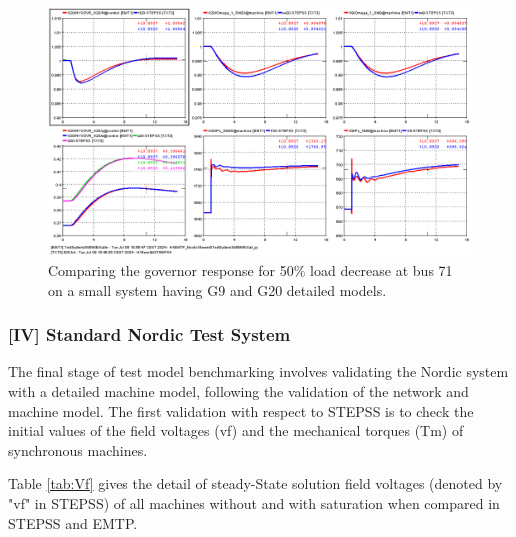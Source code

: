 \documentclass{report}
\begin{document}
\begin{figure}
    \centering
    \includegraphics[width=1.0\linewidth]{Figure_Nordic/L71C150.png}
    \caption{Comparing the governor response for 50\% load decrease at bus 71 on a small system having G9 and G20 detailed models.}
    \label{fig:G9G20Torque}
\end{figure}
\subsubsection{[IV] Standard Nordic Test System}
The final stage of test model benchmarking involves validating the Nordic system with a detailed machine model, following the validation of the network and machine model. The first validation with respect to STEPSS is to check the initial values of the field voltages (vf) and the mechanical torques (Tm) of synchronous machines.

Table \ref{tab:Vf} gives the detail of steady-State solution field voltages (denoted by "vf" in STEPSS) of all machines without and with saturation when compared in STEPSS and EMTP. 
\end{document}
